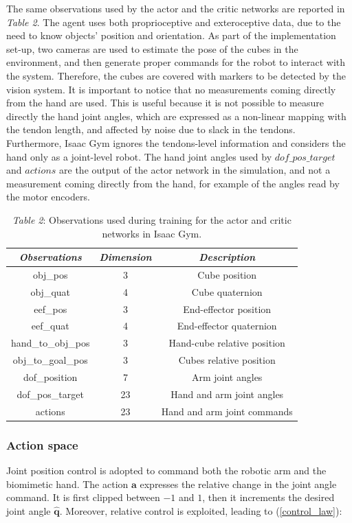 \documentclass[a4paper]{article}
\begin{document}
The same observations used by the actor and the critic networks are reported in \textit{Table 2}. The agent uses both proprioceptive and exteroceptive data, due to the need to know objects' position and orientation. As part of the implementation set-up, two cameras are used to estimate the pose of the cubes in the environment, and then generate proper commands for the robot to interact with the system. Therefore, the cubes are covered with markers to be detected by the vision system. It is important to notice that no measurements coming directly from the hand are used. This is useful because it is not possible to measure directly the hand joint angles, which are expressed as a non-linear mapping with the tendon length, and affected by noise due to slack in the tendons. Furthermore, Isaac Gym ignores the tendons-level information and considers the hand only as a joint-level robot. The hand joint angles used by $dof\_pos\_target$ and $actions$ are the output of the actor network in the simulation, and not a measurement coming directly from the hand, for example of the angles read by the motor encoders.

\begin{table}[h]
    \centering
    \begin{tabular}{|c|c|c|}
    \hline \textit{\textbf{Observations}} & \textit{\textbf{Dimension}} & \textit{\textbf{Description}}\\
    \hline obj\_pos & 3 & Cube position\\
    \hline obj\_quat & 4 & Cube quaternion\\
    \hline eef\_pos & 3 & End-effector position\\
    \hline eef\_quat & 4 & End-effector quaternion\\
    \hline hand\_to\_obj\_pos & 3 & Hand-cube relative position\\
    \hline obj\_to\_goal\_pos & 3 & Cubes relative position\\
    \hline dof\_position & 7 & Arm joint angles\\
    \hline dof\_pos\_target & 23 & Hand and arm joint angles\\
    \hline actions & 23 & Hand and arm joint commands\\
    \hline
    \end{tabular}
    \caption*{\textit{Table 2}: Observations used during training for the actor and critic networks in Isaac Gym.}
\end{table}

\newpage
\subsubsection{Action space}
Joint position control is adopted to command both the robotic arm and the biomimetic hand. The action $\textbf{a}$ expresses the relative change in the joint angle command. It is first clipped between $-1$ and $1$, then it increments the desired joint angle $\hat{\textbf{q}}$. Moreover, relative control is exploited, leading to (\ref{control_law}):
\end{document}
